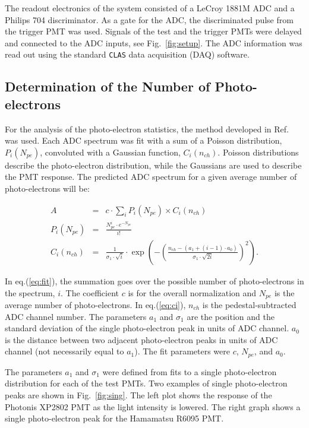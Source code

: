 The readout electronics of the system consisted of a LeCroy 1881M ADC and a 
Philips 704 discriminator.  As a gate for the ADC, the discriminated pulse 
from the trigger PMT was used.  Signals of the test and the trigger PMTs were 
delayed and connected to the ADC inputs, see Fig.~\ref{fig:setup}.  The
ADC information was read out using the standard {\tt CLAS} data
acquisition (DAQ) software.

\subsection{Determination of the Number of Photo-electrons} 

For the analysis of the photo-electron statistics, the method developed in
Ref.~\cite{yield} was used.  Each ADC spectrum was fit with a sum of a 
Poisson distribution, $P_i(N_{pe})$, convoluted with a Gaussian function,
$C_i(n_{ch})$.  Poisson distributions describe the photo-electron 
distribution, while the Gaussians are used to describe the PMT response. 
The predicted ADC spectrum for a given average number of photo-electrons 
will be:

\begin{eqnarray}
\label{eq:fit}
A&=&c\cdot\sum_i P_i(N_{pe})\times C_i(n_{ch}) \\
\label{eq:pi}
P_i(N_{pe})&=&\frac {N^i_{pe}\cdot e^{-N_{pe}} } {i!} \\
\label{eq:ci}
C_i(n_{ch})&=&\frac {1} {\sigma_1\cdot\sqrt{i}} \cdot
\exp \left( -(\frac {n_{ch}-(a_1+(i-1)\cdot a_0)} 
{\sigma_1\cdot\sqrt{2i}})^2 \right). 
\end{eqnarray}
 
In eq.(\ref{eq:fit}), the summation goes over the possible number of
photo-electrons in the spectrum, $i$.  The coefficient $c$ is for the 
overall normalization and $N_{pe}$ is the average number of photo-electrons. 
In eq.(\ref{eq:ci}), $n_{ch}$ is the pedestal-subtracted ADC channel number. 
The parameters $a_1$ and $\sigma_1$ are the position and the standard 
deviation of the single photo-electron peak in units of ADC channel. 
$a_0$ is the distance between two adjacent photo-electron peaks in units 
of ADC channel (not necessarily equal to $a_1$). The fit parameters were 
$c$, $N_{pe}$, and $a_0$. 

The parameters $a_1$ and $\sigma_1$ were defined from fits to a single
photo-electron distribution for each of the test PMTs.  Two examples of 
single photo-electron peaks are shown in Fig.~\ref{fig:sing}.  The left 
plot shows the response of the Photonis XP2802 PMT as the light intensity 
is lowered.  The right graph shows a single photo-electron peak for the 
Hamamatsu R6095 PMT.

